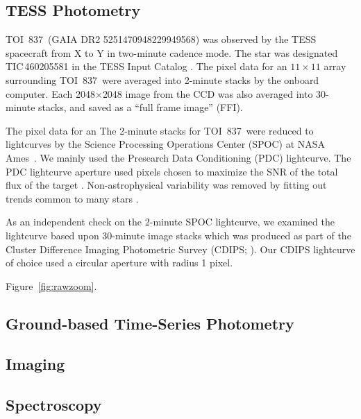 \documentclass[12pt,twocolumn,tighten]{aastex62}
\newcommand{\tn}{TOI~837} %
\begin{document}
\subsection{TESS Photometry}
\label{subsec:tess}

\tn\ (GAIA DR2 5251470948229949568) was observed by the
TESS spacecraft from X to Y in two-minute cadence mode.
The star was designated
TIC\,460205581 in the TESS Input Catalog
\citep{stassun_TIC_2018,stassun_TIC8_2019}.
The pixel data for an
$11\times11$ array surrounding \tn\ were averaged into 2-minute
stacks by the onboard computer.  Each 2048$\times$2048 image from the
CCD was also averaged into 30-minute stacks, and saved as a ``full
frame image'' (FFI).

The pixel data for an
The 2-minute stacks for \tn\ were reduced to lightcurves by the
Science Processing Operations Center (SPOC) at NASA
Ames~\citep{jenkins_tess_2016}.  We mainly used the Presearch Data
Conditioning (PDC) lightcurve.  The PDC lightcurve aperture used
pixels chosen to maximize the SNR of the total flux of the target
\citep{smith_finding_2016}.  Non-astrophysical variability
was removed by fitting out trends common to many stars
\citep{smith_kepler_2012,stumpe_multiscale_2014}.

As an independent check on the 2-minute SPOC lightcurve, we examined
the lightcurve based upon 30-minute image stacks which was produced as
part of the Cluster Difference Imaging Photometric Survey (CDIPS;
\citealt{bouma_cluster_2019}).  Our CDIPS lightcurve of choice used a
circular aperture with radius 1 pixel.



Figure~\ref{fig:rawzoom}.

\subsection{Ground-based Time-Series Photometry}
\label{subsec:groundphot}

  

\subsection{Imaging}

\subsection{Spectroscopy}
\end{document}
